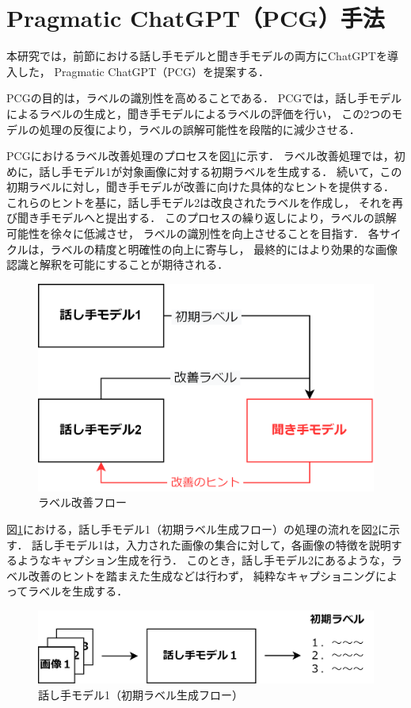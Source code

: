 \documentclass[a4paper,11pt]{jreport}
\begin{document}
\section{Pragmatic ChatGPT（PCG）手法}
本研究では，前節における話し手モデルと聞き手モデルの両方にChatGPTを導入した，
Pragmatic ChatGPT（PCG）を提案する．

PCGの目的は，ラベルの識別性を高めることである．
PCGでは，話し手モデルによるラベルの生成と，聞き手モデルによるラベルの評価を行い，
この2つのモデルの処理の反復により，ラベルの誤解可能性を段階的に減少させる．

PCGにおけるラベル改善処理のプロセスを図\ref{fig:PCGflow}に示す．
ラベル改善処理では，初めに，話し手モデル1が対象画像に対する初期ラベルを生成する．
続いて，この初期ラベルに対し，聞き手モデルが改善に向けた具体的なヒントを提供する．
これらのヒントを基に，話し手モデル2は改良されたラベルを作成し，
それを再び聞き手モデルへと提出する．
このプロセスの繰り返しにより，ラベルの誤解可能性を徐々に低減させ，
ラベルの識別性を向上させることを目指す．
各サイクルは，ラベルの精度と明確性の向上に寄与し，
最終的にはより効果的な画像認識と解釈を可能にすることが期待される．

\begin{figure}[H]
	\centering
	\includegraphics[width=0.8\linewidth]{figures/PCGflow.png}
	\caption{ラベル改善フロー}
	\label{fig:PCGflow}
\end{figure}

図\ref{fig:PCGflow}における，話し手モデル1（初期ラベル生成フロー）の処理の流れを図\ref{fig:PCGspeaker1}に示す．
話し手モデル1は，入力された画像の集合に対して，各画像の特徴を説明するようなキャプション生成を行う．
このとき，話し手モデル2にあるような，ラベル改善のヒントを踏まえた生成などは行わず，
純粋なキャプショニングによってラベルを生成する．

\begin{figure}[H]
	\centering
	\includegraphics[width=0.8\linewidth]{figures/PCGspeaker1.png}
	\caption{話し手モデル1（初期ラベル生成フロー）}
	\label{fig:PCGspeaker1}
\end{figure}
\end{document}
